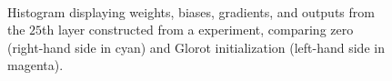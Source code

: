 \begin{figure}
    \hfill
    \\
    \hfill
  \caption{Histogram displaying weights, biases, gradients, and outputs from the $25$th layer constructed from a \cifar experiment, comparing zero (right-hand side in cyan) and Glorot initialization (left-hand side in magenta).}
  \label{fig:histo} 
\end{figure}

